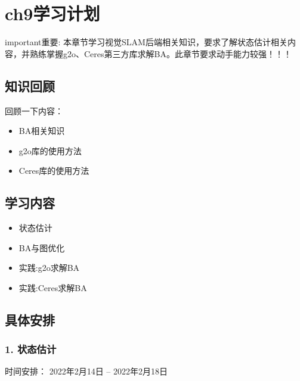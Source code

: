 \documentclass[letterpaper,10pt,english]{sphinxmanual}
\begin{document}
\section{ch9学习计划}
\label{\detokenize{ch9/ch9_u5b66_u4e60_u8ba1_u5212:ch9}}\label{\detokenize{ch9/ch9_u5b66_u4e60_u8ba1_u5212::doc}}
\begin{sphinxadmonition}{important}{重要:}
\sphinxAtStartPar
本章节学习视觉SLAM后端相关知识，要求了解状态估计相关内容，并熟练掌握g2o、Ceres第三方库求解BA。此章节要求动手能力较强！！！
\end{sphinxadmonition}


\subsection{知识回顾}
\label{\detokenize{ch9/ch9_u5b66_u4e60_u8ba1_u5212:id1}}
\sphinxAtStartPar
回顾一下内容：
\begin{itemize}
\item {} 
\sphinxAtStartPar
BA相关知识

\item {} 
\sphinxAtStartPar
g2o库的使用方法

\item {} 
\sphinxAtStartPar
Ceres库的使用方法

\end{itemize}


\subsection{学习内容}
\label{\detokenize{ch9/ch9_u5b66_u4e60_u8ba1_u5212:id2}}\begin{itemize}
\item {} 
\sphinxAtStartPar
状态估计

\item {} 
\sphinxAtStartPar
BA与图优化

\item {} 
\sphinxAtStartPar
实践:g2o求解BA

\item {} 
\sphinxAtStartPar
实践:Ceres求解BA

\end{itemize}


\subsection{具体安排}
\label{\detokenize{ch9/ch9_u5b66_u4e60_u8ba1_u5212:id3}}

\subsubsection{1. 状态估计}
\label{\detokenize{ch9/ch9_u5b66_u4e60_u8ba1_u5212:id4}}
\sphinxAtStartPar
时间安排： 2022年2月14日 – 2022年2月18日
\end{document}
